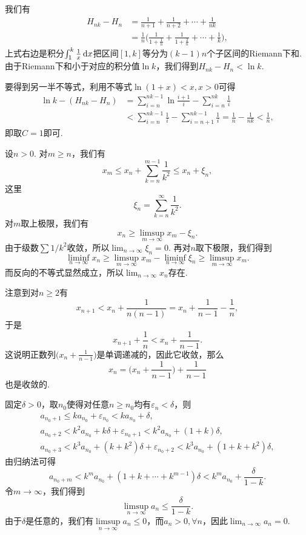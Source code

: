 \begin{ans}
  我们有
  \begin{align*}
    H_{nk}-H_n & =\frac1{n+1}+\frac1{n+2}+\cdots+\frac1{nk}\\
    & = \frac1n\bigg(\frac1{1+\frac1n}+\frac1{
    1+\frac2n}+\cdots+\frac1k\bigg),
  \end{align*}
  上式右边是积分$\int_1^k\frac1x\,\mathrm dx$把区间$[1,k]$等分为$(k-1)n$个子区间的Riemann下和. 由于Riemann下和小于对应的积分值$\ln k$，我们得到$H_{nk}-H_n<\ln k$.

  要得到另一半不等式，利用不等式$\ln(1+x)<x,x>0$可得
  \begin{align*}
    \ln k - (H_{nk}-H_n) & = \sum_{i=n}^{nk-1}\ln\frac{i+1}i-\sum_{i=n}^{nk}\frac1{i}\\
    & <\sum_{i=n}^{nk-1}\frac1i-\sum_{i=n+1}^{nk-1}\frac1{i}
    = \frac1n-\frac1{nk}<\frac 1n,
  \end{align*}
  即取$C=1$即可.
\end{ans}

\begin{ans}
  \method 设$n>0$. 对$m\ge n$，我们有
  \[ x_m\le x_n+\sum_{k=n}^{m-1}\frac1{k^2}\le x_n+\xi_n, \]
  这里
  \[\xi_n=\sum_{k=n}^\infty \frac1{k^2}.\]
  对$m$取上极限，我们有
  \[ x_n\ge \limsup_{m\to\infty}x_m-\xi_n. \]
  由于级数$\sum1/k^2$收敛，所以$\lim_{n\to\infty}\xi_n=0$. 再对$n$取下极限，我们得到
  \[ \liminf_{n\to\infty}x_n\ge \limsup_{m\to\infty}x_m
  -\liminf_{n\to\infty}\xi_n\ge \limsup_{m\to\infty}x_m.\]
  而反向的不等式显然成立，所以$\lim_{n\to\infty}x_n$存在.

  \method 注意到对$n\ge2$有
  \[ x_{n+1}<x_n+\frac1{n(n-1)}
  =x_n + \frac1{n-1} - \frac1n, \]
  于是
  \[ x_{n+1}+\frac1n<x_n+\frac1{n-1}. \]
  这说明正数列$\big(x_{n}+\frac1{n-1}\big)$是单调递减的，因此它收敛，那么
  \[ x_n=\Big(x_n+\frac1{n-1}\Big)+\frac1{n-1} \]
  也是收敛的.
\end{ans}

\begin{ans}
  固定$\delta>0$，取$n_0$使得对任意$n\ge n_0$均有$\varepsilon_n<\delta$，则
  \begin{gather*}
    a_{n_0+1}  \le ka_{n_0} + \varepsilon_{n_0} < ka_{n_0}+\delta,\\
    a_{n_0+2} < k^2a_{n_0}+k\delta +\varepsilon_{n_0+1}
    < k^2a_{n_0}+(1+k)\delta,\\
    a_{n_0+3}<k^3a_{n_0}+(k+k^2)\delta+\varepsilon_{n_0+2}
    < k^3a_{n_0}+(1+k+k^2)\delta,
  \end{gather*}
  由归纳法可得
  \[ a_{n_0+m}<k^ma_{n_0}+(1+k+\cdots+k^{m-1})\delta
  <k^ma_{n_0}+\frac{\delta}{1-k}. \]
  令$m\to\infty$，我们得到
  \[ \limsup_{n\to\infty} a_n\le \frac\delta{1-k}. \]
  由于$\delta$是任意的，我们有$\limsup\limits_{n\to\infty}
  a_n\le 0$，而$a_n>0,\forall n$，因此$\lim_{n\to\infty}a_n=0$.
\end{ans}

